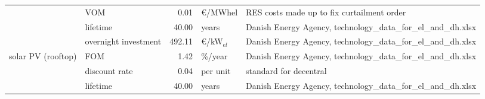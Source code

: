 \begin{longtable}{p{4cm}p{4cm}rp{3cm}p{10cm}}
                      & VOM &         0.01 &                   \euro/MWhel &                                                                                                                                                                                                                                                                                           RES costs made up to fix curtailment order \\
                      & lifetime &        40.00 &                         years &                                                                                                                                                                                                                                                                        Danish Energy Agency, technology\_data\_for\_el\_and\_dh.xlsx \\
                      & overnight investment &       492.11 &               \euro/kW$_{el}$ &                                                                                                                                                                                                                                                                        Danish Energy Agency, technology\_data\_for\_el\_and\_dh.xlsx \\
solar PV (rooftop) & FOM &         1.42 &                       \%/year &                                                                                                                                                                                                                                                                        Danish Energy Agency, technology\_data\_for\_el\_and\_dh.xlsx \\
                      & discount rate &         0.04 &                      per unit &                                                                                                                                                                                                                                                                                                               standard for decentral \\
                      & lifetime &        40.00 &                         years &                                                                                                                                                                                                                                                                        Danish Energy Agency, technology\_data\_for\_el\_and\_dh.xlsx \\

\end{longtable}
